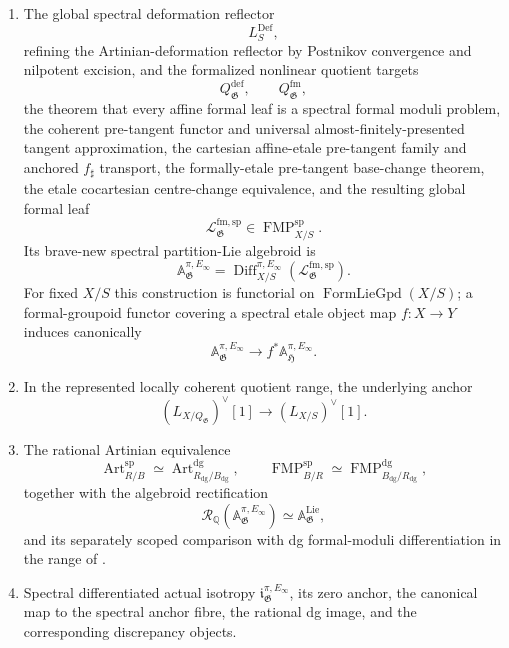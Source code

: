 \begin{theorem}
\begin{enumerate}
    \item The global spectral deformation reflector
    \[
        L^{\mathrm{Def}}_S,
    \]
    refining the Artinian-deformation reflector by Postnikov convergence and
    nilpotent excision, and the formalized nonlinear quotient targets
    \[
        Q^{\mathrm{def}}_{\mathfrak G},
        \qquad
        Q^{\mathrm{fm}}_{\mathfrak G},
    \]
    the theorem that every affine formal leaf is a spectral formal moduli
    problem, the coherent pre-tangent functor and universal
    almost-finitely-presented tangent approximation, the cartesian
    affine-etale pre-tangent family and anchored $f_\sharp$ transport, the
    formally-etale pre-tangent base-change theorem, the etale cocartesian centre-change
    equivalence, and the resulting global formal leaf
    \[
        \mathcal L^{\mathrm{fm,sp}}_{\mathfrak G}
        \in
        \operatorname{FMP}^{\mathrm{sp}}_{X/S}.
    \]
    Its brave-new spectral partition-Lie algebroid is
    \[
        \mathbb A^{\pi,E_\infty}_{\mathfrak G}
        =
        \operatorname{Diff}^{\pi,E_\infty}_{X/S}
        (\mathcal L^{\mathrm{fm,sp}}_{\mathfrak G}).
    \]
    For fixed $X/S$ this construction is functorial on
    $\operatorname{FormLieGpd}(X/S)$; a formal-groupoid functor covering a
    spectral etale object map $f:X\to Y$ induces canonically
    \[
        \mathbb A^{\pi,E_\infty}_{\mathfrak G}
        \longrightarrow
        f^*\mathbb A^{\pi,E_\infty}_{\mathfrak H}.
    \]

    \item In the represented locally coherent quotient range, the underlying
    anchor
    \[
        (L_{X/Q_{\mathfrak G}})^\vee[1]
        \longrightarrow
        (L_{X/S})^\vee[1].
    \]

    \item The rational Artinian equivalence
    \[
        \operatorname{Art}^{\mathrm{sp}}_{R/B}
        \simeq
        \operatorname{Art}^{\mathrm{dg}}_{R_{\mathrm{dg}}/B_{\mathrm{dg}}},
        \qquad
        \operatorname{FMP}^{\mathrm{sp}}_{B/R}
        \simeq
        \operatorname{FMP}^{\mathrm{dg}}_{B_{\mathrm{dg}}/R_{\mathrm{dg}}},
    \]
    together with the algebroid rectification
    \[
        \mathcal R_{\mathbb Q}
        (\mathbb A^{\pi,E_\infty}_{\mathfrak G})
        \simeq
        \mathbb A^{\mathrm{Lie}}_{\mathfrak G},
    \]
    and its separately scoped comparison with dg formal-moduli
    differentiation in the range of \cite{Nuiten2019}.

    \item Spectral differentiated actual isotropy
    $\mathfrak i^{\pi,E_\infty}_{\mathfrak G}$, its zero anchor, the canonical
    map to the spectral anchor fibre, the rational dg image, and the
    corresponding discrepancy objects.


\end{enumerate}
\end{theorem}
